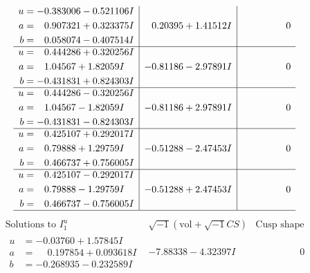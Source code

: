 \documentclass[1p]{elsarticle_modified}
\theoremstyle{definition}
\newcommand{\I}{\sqrt{-1}}
\begin{document}
$$\begin{array}{c|c|c}
\begin{aligned}
u &= -0.383006 - 0.521106 I \\
a &= \phantom{-}0.907321 + 0.323375 I \\
b &= \phantom{-}0.058074 - 0.407514 I\end{aligned}
 & \phantom{-}0.20395 + 1.41512 I & \phantom{-0.000000 } 0 \\ \hline\begin{aligned}
u &= \phantom{-}0.444286 + 0.320256 I \\
a &= \phantom{-}1.04567 + 1.82059 I \\
b &= -0.431831 + 0.824303 I\end{aligned}
 & -0.81186 - 2.97891 I & \phantom{-0.000000 } 0 \\ \hline\begin{aligned}
u &= \phantom{-}0.444286 - 0.320256 I \\
a &= \phantom{-}1.04567 - 1.82059 I \\
b &= -0.431831 - 0.824303 I\end{aligned}
 & -0.81186 + 2.97891 I & \phantom{-0.000000 } 0 \\ \hline\begin{aligned}
u &= \phantom{-}0.425107 + 0.292017 I \\
a &= \phantom{-}0.79888 + 1.29759 I \\
b &= \phantom{-}0.466737 + 0.756005 I\end{aligned}
 & -0.51288 - 2.47453 I & \phantom{-0.000000 } 0 \\ \hline\begin{aligned}
u &= \phantom{-}0.425107 - 0.292017 I \\
a &= \phantom{-}0.79888 - 1.29759 I \\
b &= \phantom{-}0.466737 - 0.756005 I\end{aligned}
 & -0.51288 + 2.47453 I & \phantom{-0.000000 } 0\\
 \hline 
 \end{array}$$\newpage$$\begin{array}{c|c|c}  
\text{Solutions to }I^u_{1}& \I (\text{vol} + \sqrt{-1}CS) & \text{Cusp shape}\\
 \hline 
\begin{aligned}
u &= -0.03760 + 1.57845 I \\
a &= \phantom{-}0.197854 + 0.093618 I \\
b &= -0.268935 - 0.232589 I\end{aligned}
 & -7.88338 - 4.32397 I & \phantom{-0.000000 } 0 \\ \hline\begin{aligned}

\end{aligned}
\end{array}$$
\end{document}

